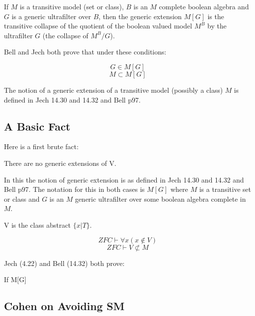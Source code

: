 \documentclass[10pt,titlepage]{article}
\begin{document}
If $M$ is a transitive model (set or class), $B$ is an $M$ complete boolean algebra and $G$ is a generic ultrafilter over $B$, then the generic extension $M[G]$ is the transitive collapse of the quotient of the boolean valued model $M^B$ by the ultrafilter $G$ (the collapse of $M^B/G$).
 
Bell and Jech both prove that under these conditions:

\begin{equation}
G \in M[G] \label{2}
\end{equation}
\begin{equation}
M \subset M[G] \label{3}
\end{equation}

The notion of a generic extension of a transitive model (possibly a class) $M$ is defined in Jech 14.30 and 14.32 and Bell p97.

\subsection{A Basic Fact}

Here is a first brute fact:

There are no generic extensions of V.

In this the notion of generic extension is as defined in Jech 14.30 and 14.32 and Bell p97.
The notation for this in both cases is $M[G]$ where $M$ is a transitive set or class and $G$ is an $M$ generic ultrafilter over some boolean algebra complete in $M$.
 
V is the class abstract $\{x | T\}$.

\begin{equation}
ZFC \vdash \forall x (x \not\in V)
\end{equation}
\begin{equation}
ZFC \vdash V \not\subset M
\end{equation}

Jech \cite{jech2002} (4.22) and Bell \cite{bell2005} (14.32) both prove:

If M[G]



\appendix

\subsection{Cohen on Avoiding SM}
\end{document}
